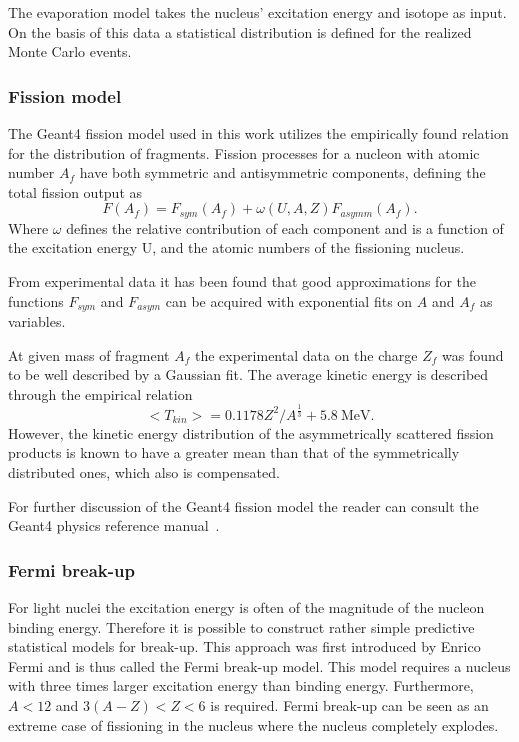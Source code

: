 The evaporation model takes the nucleus' excitation energy and isotope as input. On the basis of this data a statistical distribution is defined for the realized Monte Carlo events.

\subsubsection{Fission model}

The Geant4 fission model used in this work utilizes the empirically found relation for the distribution of fragments. Fission processes for a nucleon with atomic number $A_f$ have both symmetric and antisymmetric components, defining the total fission output as
\begin{equation}
 F(A_f) = F_{sym}(A_f) + \omega(U,A,Z) F_{asymm}(A_f).
\label{fissionSymmetricAsymmetric}
\end{equation}
Where $\omega$ defines the relative contribution of each component and is a function of the excitation energy U, and the atomic numbers of the fissioning nucleus.

From experimental data it has been found that good approximations for the functions $F_{sym}$ and $F_{asym}$ can be acquired with exponential fits on $A$ and $A_f$ as variables.

At given mass of fragment $A_f$ the experimental data on the charge $Z_f$ was found to be well described by a Gaussian fit. The average kinetic energy is described through the empirical relation \begin{equation}<T_{kin}>=0.1178Z^2/A^\frac{1}{3} + 5.8~\text{MeV.}\end{equation}However, the kinetic energy distribution of the asymmetrically scattered fission products is known to have a greater mean than that of the symmetrically distributed ones, which also is compensated.

For further discussion of the Geant4 fission model the reader can consult the Geant4 physics reference manual~\cite{physicsManual}. %

\subsubsection{Fermi break-up}

For light nuclei the excitation energy is often of the magnitude of the nucleon binding energy. Therefore it is possible to construct rather simple predictive statistical models for break-up. This approach was first introduced by Enrico Fermi and is thus called the Fermi break-up model. This model requires a nucleus with three times larger excitation energy than binding energy. Furthermore, $A < 12$ and $3(A - Z) < Z < 6$ is required. Fermi break-up can be seen as an extreme case of fissioning in the nucleus where the nucleus completely explodes. %
\clearpage
